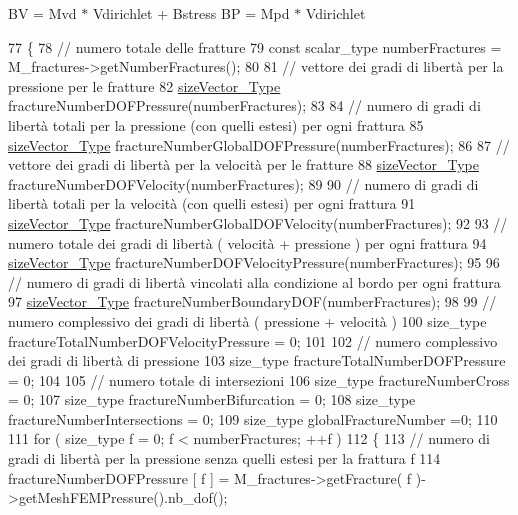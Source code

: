 B\-V = Mvd $\ast$ Vdirichlet + Bstress B\-P = Mpd $\ast$ Vdirichlet 
\begin{DoxyCode}
77 \{
78     \textcolor{comment}{// numero totale delle fratture}
79     \textcolor{keyword}{const} scalar\_type numberFractures = M\_fractures->getNumberFractures();
80     
81     \textcolor{comment}{// vettore dei gradi di libertà per la pressione per le fratture}
82     \hyperlink{Core_8h_a83c51913d041a5001e8683434c09857f}{sizeVector\_Type} fractureNumberDOFPressure(numberFractures);
83 
84     \textcolor{comment}{// numero di gradi di libertà totali per la pressione (con quelli estesi) per ogni frattura }
85     \hyperlink{Core_8h_a83c51913d041a5001e8683434c09857f}{sizeVector\_Type} fractureNumberGlobalDOFPressure(numberFractures);
86 
87     \textcolor{comment}{// vettore dei gradi di libertà per la velocità per le fratture}
88     \hyperlink{Core_8h_a83c51913d041a5001e8683434c09857f}{sizeVector\_Type} fractureNumberDOFVelocity(numberFractures);
89 
90     \textcolor{comment}{// numero di gradi di libertà totali per la velocità (con quelli estesi) per ogni frattura }
91     \hyperlink{Core_8h_a83c51913d041a5001e8683434c09857f}{sizeVector\_Type} fractureNumberGlobalDOFVelocity(numberFractures);
92 
93     \textcolor{comment}{// numero totale dei gradi di libertà ( velocità + pressione ) per ogni frattura}
94     \hyperlink{Core_8h_a83c51913d041a5001e8683434c09857f}{sizeVector\_Type} fractureNumberDOFVelocityPressure(numberFractures);
95 
96     \textcolor{comment}{// numero di gradi di libertà vincolati alla condizione al bordo per ogni frattura}
97     \hyperlink{Core_8h_a83c51913d041a5001e8683434c09857f}{sizeVector\_Type} fractureNumberBoundaryDOF(numberFractures);
98 
99     \textcolor{comment}{// numero complessivo dei gradi di libertà ( pressione + velocità ) }
100     size\_type fractureTotalNumberDOFVelocityPressure = 0;
101 
102     \textcolor{comment}{// numero complessivo dei gradi di libertà di pressione }
103     size\_type fractureTotalNumberDOFPressure = 0;
104 
105     \textcolor{comment}{// numero totale di intersezioni}
106     size\_type fractureNumberCross = 0;
107     size\_type fractureNumberBifurcation = 0;
108     size\_type fractureNumberIntersections = 0;
109     size\_type globalFractureNumber =0;
110     
111     \textcolor{keywordflow}{for} ( size\_type f = 0; f < numberFractures; ++f )
112     \{
113         \textcolor{comment}{// numero di gradi di libertà per la pressione senza quelli estesi per la frattura f}
114         fractureNumberDOFPressure [ f ] = M\_fractures->getFracture( f )->getMeshFEMPressure().nb\_dof();

\end{DoxyCode}
